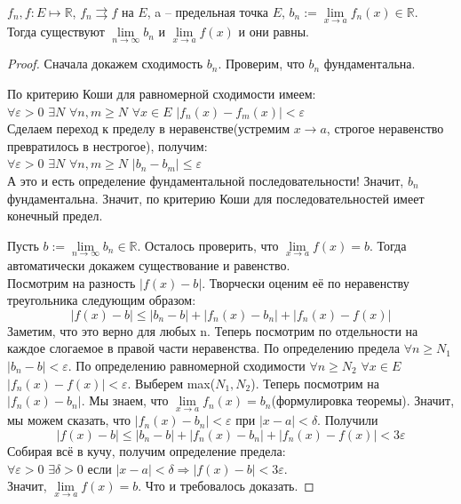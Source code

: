 
\begin{theorem} \thmslashn

  $f_n, f : E \mapsto \mathbb{R}$, $f_n \rightrightarrows f$ на $E$, a -- предельная точка $E$, $b_n := \lim\limits_{x\to a} f_n(x) \in \mathbb{R}$.\\ Тогда существуют $\lim\limits_{n\to \infty} b_n$ и $\lim\limits_{x\to a} f(x)$ и они равны.
  
\begin{proof} \thmslashn

    Сначала докажем сходимость $b_n$. Проверим, что $b_n$ фундаментальна.
  
  По критерию Коши для равномерной сходимости имеем: \\
  $\forall \varepsilon > 0$ $\exists N$ $\forall n, m \geq N$  $\forall x \in E$ $|f_n(x) - f_m(x)| < \varepsilon$\\
  Сделаем переход к пределу в неравенстве(устремим $x \to a$, строгое неравенство превратилось в нестрогое), получим: \\
   $\forall \varepsilon > 0$ $\exists N$ $\forall n, m \geq N$ $|b_n - b_m| \leq \varepsilon$\\
  А это и есть определение фундаментальной последовательности! Значит, $b_n$ фундаментальна. Значит, по критерию Коши для последовательностей имеет конечный предел.
  
  Пусть $b := \lim\limits_{n\to \infty} b_n \in \mathbb{R}$.
  Осталось проверить, что $\lim\limits_{x\to a} f(x) = b$. Тогда автоматически докажем существование и равенство.\\
  Посмотрим на разность $|f(x) - b|$. Творчески оценим её по неравенству треугольника следующим образом:\\
  \[|f(x) - b| \leq |b_n - b| + |f_n(x) - b_n| + |f_n(x) - f(x)|\]
  Заметим, что это верно для любых n. Теперь посмотрим по отдельности на каждое слогаемое в правой части неравенства. По определению предела $\forall n \geq N_1$ $|b_n - b| < \varepsilon$. По определению равномерной сходимости $\forall n \geq N_2$ $\forall x \in E$ $|f_n(x) - f(x)| < \varepsilon$. Выберем max($N_1, N_2$). Теперь посмотрим на $|f_n(x) - b_n|$. Мы знаем, что $\lim\limits_{x\to a} f_n(x) = b_n$(формулировка теоремы). Значит, мы можем сказать, что $|f_n(x) - b_n| < \varepsilon$ при $|x - a| < \delta$. Получили
  \[|f(x) - b| \leq |b_n - b| + |f_n(x) - b_n| + |f_n(x) - f(x)| < 3\varepsilon\]
  Собирая всё в кучу, получим определение предела:\\
  $\forall \varepsilon > 0$ $\exists \delta > 0$ если $|x - a| < \delta \Rightarrow |f(x) - b| < 3\varepsilon$. \\
  Значит, $\lim\limits_{x\to a} f(x) = b$. Что и требовалось доказать.
	
\end{proof}
\end{theorem}


